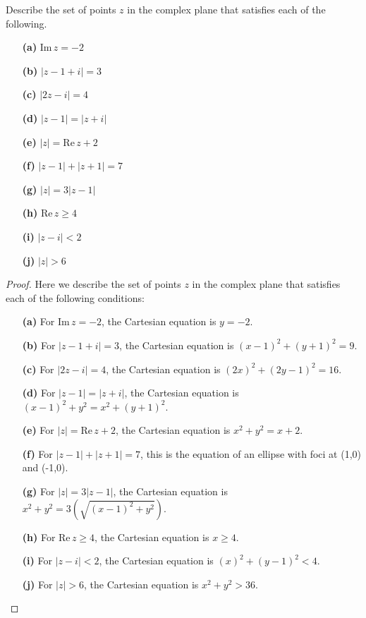 \documentclass[
	12pt, %
	fleqn, %
	a4paper, %
]{LegrandOrangeBook}
\begin{document}
\begin{exercise}
    Describe the set of points \( z \) in the complex plane that satisfies each of the following.
    \begin{enumerate}
        \item[\textbf{(a)}] \( \text{Im} \, z = -2 \)
        \item[\textbf{(b)}] \( |z - 1 + i| = 3 \)
        \item[\textbf{(c)}] \( |2z - i| = 4 \)
        \item[\textbf{(d)}] \( |z - 1| = |z + i| \)
        \item[\textbf{(e)}] \( |z| = \text{Re} \, z + 2 \)
        \item[\textbf{(f)}] \( |z - 1| + |z + 1| = 7 \)
        \item[\textbf{(g)}] \( |z| = 3|z - 1| \)
        \item[\textbf{(h)}] \( \text{Re} \, z \geq 4 \)
        \item[\textbf{(i)}] \( |z - i| < 2 \)
        \item[\textbf{(j)}] \( |z| > 6 \)
      \end{enumerate}
\end{exercise}
\begin{proof}
    Here we describe the set of points \( z \) in the complex plane that satisfies each of the following conditions:
    
    \begin{enumerate}
      \item[\textbf{(a)}] For \( \text{Im} \, z = -2 \), the Cartesian equation is \( y = -2 \).
      \item[\textbf{(b)}] For \( |z - 1 + i| = 3 \), the Cartesian equation is \( (x - 1)^2 + (y + 1)^2 = 9 \).
      \item[\textbf{(c)}] For \( |2z - i| = 4 \), the Cartesian equation is \( (2x)^2 + (2y - 1)^2 = 16 \).
      \item[\textbf{(d)}] For \( |z - 1| = |z + i| \), the Cartesian equation is \( (x - 1)^2 + y^2 = x^2 + (y + 1)^2 \).
      \item[\textbf{(e)}] For \( |z| = \text{Re} \, z + 2 \), the Cartesian equation is \( x^2 + y^2 = x + 2 \).
      \item[\textbf{(f)}] For \( |z - 1| + |z + 1| = 7 \), this is the equation of an ellipse with foci at (1,0) and (-1,0).
      \item[\textbf{(g)}] For \( |z| = 3|z - 1| \), the Cartesian equation is \( x^2 + y^2 = 3(\sqrt{(x - 1)^2 + y^2}) \).
      \item[\textbf{(h)}] For \( \text{Re} \, z \geq 4 \), the Cartesian equation is \( x \geq 4 \).
      \item[\textbf{(i)}] For \( |z - i| < 2 \), the Cartesian equation is \( (x)^2 + (y - 1)^2 < 4 \).
      \item[\textbf{(j)}] For \( |z| > 6 \), the Cartesian equation is \( x^2 + y^2 > 36 \).
    \end{enumerate}
    \end{proof}
\end{document}
